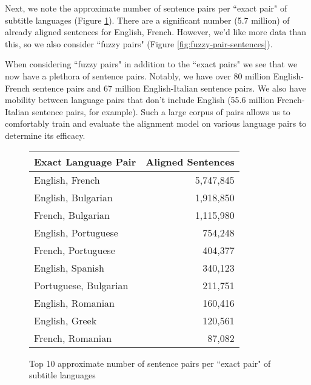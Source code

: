 \documentclass[twoside,twocolumn]{article}
\begin{document}
Next, we note the approximate number of sentence pairs per ``exact pair" of
subtitle languages (Figure \ref{fig:exact-pair-sentences}). There
are a significant number (5.7 million) of already aligned sentences for
English, French. However, we'd like more data than this, so we also consider
``fuzzy pairs" (Figure \ref{fig:fuzzy-pair-sentences}).

When considering ``fuzzy pairs" in addition to the ``exact pairs" we see that
we now have a plethora of sentence pairs. Notably, we have over 80 million
English-French sentence pairs and 67 million English-Italian sentence pairs.
We also have mobility between language pairs that don't include English
(55.6 million French-Italian sentence pairs, for example). Such a large corpus
of pairs allows us to comfortably train and evaluate the alignment model on
various language pairs to determine its efficacy.

\begin{figure}[ht]
    \centering
    \begin{tabular}{ |l|r| }
        \hline
        \multicolumn{1}{|c|}{\textbf{Exact Language Pair}} &
            \multicolumn{1}{|c|}{\textbf{Aligned Sentences}} \\ \hline
        English, French       & 5,747,845 \\ \hline
        English, Bulgarian    & 1,918,850 \\ \hline
        French, Bulgarian     & 1,115,980 \\ \hline
        English, Portuguese   & 754,248   \\ \hline
        French, Portuguese    & 404,377   \\ \hline
        English, Spanish      & 340,123   \\ \hline
        Portuguese, Bulgarian & 211,751   \\ \hline
        English, Romanian     & 160,416   \\ \hline
        English, Greek        & 120,561   \\ \hline
        French, Romanian      & 87,082    \\ \hline
    \end{tabular}

    \caption{Top 10 approximate number of sentence pairs per ``exact pair" of
             subtitle languages}
    \label{fig:exact-pair-sentences}
\end{figure}
\end{document}
